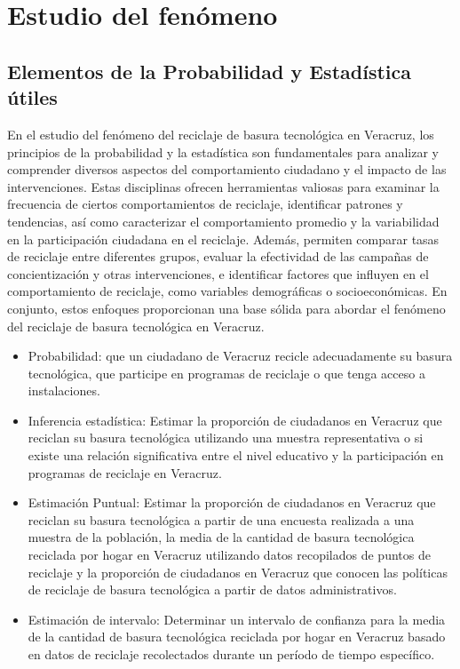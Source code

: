 \documentclass[letterpaper,12pt]{article}
\begin{document}
\begin{sloppypar}
\section{Estudio del fenómeno}
\subsection{Elementos de la Probabilidad y Estadística útiles}
En el estudio del fenómeno del reciclaje de basura tecnológica en Veracruz, los principios de la probabilidad y la estadística son fundamentales para analizar y comprender diversos aspectos del comportamiento ciudadano y el impacto de las intervenciones. Estas disciplinas ofrecen herramientas valiosas para examinar la frecuencia de ciertos comportamientos de reciclaje, identificar patrones y tendencias, así como caracterizar el comportamiento promedio y la variabilidad en la participación ciudadana en el reciclaje. Además, permiten comparar tasas de reciclaje entre diferentes grupos, evaluar la efectividad de las campañas de concientización y otras intervenciones, e identificar factores que influyen en el comportamiento de reciclaje, como variables demográficas o socioeconómicas. En conjunto, estos enfoques proporcionan una base sólida para abordar el fenómeno del reciclaje de basura tecnológica en Veracruz.
\begin{itemize}
    \item Probabilidad: que un ciudadano de Veracruz recicle adecuadamente su basura tecnológica, que participe en programas de reciclaje o que tenga acceso a instalaciones.
    \item Inferencia estadística: Estimar la proporción de ciudadanos en Veracruz que reciclan su basura tecnológica utilizando una muestra representativa o si existe una relación significativa entre el nivel educativo y la participación en programas de reciclaje en Veracruz.
    \item Estimación Puntual: Estimar la proporción de ciudadanos en Veracruz que reciclan su basura tecnológica a partir de una encuesta realizada a una muestra de la población, la media de la cantidad de basura tecnológica reciclada por hogar en Veracruz utilizando datos recopilados de puntos de reciclaje y la proporción de ciudadanos en Veracruz que conocen las políticas de reciclaje de basura tecnológica a partir de datos administrativos.
    \item Estimación de intervalo: Determinar un intervalo de confianza para la media de la cantidad de basura tecnológica reciclada por hogar en Veracruz basado en datos de reciclaje recolectados durante un período de tiempo específico.

\end{itemize}
\end{sloppypar}
\end{document}

